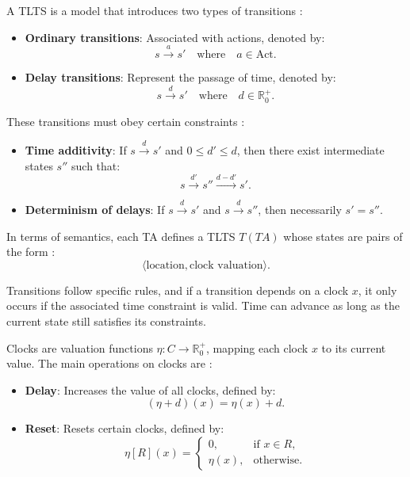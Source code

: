 A TLTS is a model that introduces two types of transitions \cite{baier2008principles}: 

\begin{itemize}
    \item \textbf{Ordinary transitions}: Associated with actions, denoted by:
    \[
        s \xrightarrow{a} s' \quad \text{where} \quad a \in \text{Act}.
    \]
    \item \textbf{Delay transitions}: Represent the passage of time, denoted by:
    \[
        s \xrightarrow{d} s' \quad \text{where} \quad d \in \mathbb{R}^+_0.
    \]
\end{itemize}

These transitions must obey certain constraints \cite{baier2008principles}:

\begin{itemize}
    \item \textbf{Time additivity}: If \( s \xrightarrow{d} s' \) and \( 0 \leq d' \leq d \), then there exist intermediate states \( s'' \) such that:
    \[
        s \xrightarrow{d'} s'' \xrightarrow{d - d'} s'.
    \]
    \item \textbf{Determinism of delays}: If \( s \xrightarrow{d} s' \) and \( s \xrightarrow{d} s'' \), then necessarily \( s' = s'' \).
\end{itemize}

In terms of semantics, each TA defines a TLTS \( T(TA) \) whose states are pairs of the form \cite{baier2008principles}:
\[
    \langle \text{location}, \text{clock valuation} \rangle.
\]

Transitions follow specific rules, and if a transition depends on a clock \( x \), it only occurs if the associated time constraint is valid. Time can advance as long as the current state still satisfies its constraints.

Clocks are valuation functions \( \eta: C \to \mathbb{R}^+_0 \), mapping each clock \( x \) to its current value. The main operations on clocks are \cite{baier2008principles}:

\begin{itemize}
    \item \textbf{Delay}: Increases the value of all clocks, defined by:
    \[
        (\eta + d)(x) = \eta(x) + d.
    \]
    \item \textbf{Reset}: Resets certain clocks, defined by:
    \[
        \eta[R](x) = 
        \begin{cases}
            0, & \text{if } x \in R, \\
            \eta(x), & \text{otherwise}.
        \end{cases}
    \]
\end{itemize}

